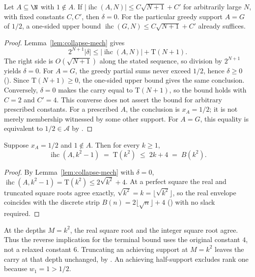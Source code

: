 \begin{prop}
\label{prop:collapse}
Let $A \subseteq \N$ with $1 \notin A$. If $|\operatorname{ihc}(A,N)|\le C\sqrt{N+1}+C'$ for arbitrarily
large $N$, with fixed constants $C,C'$, then $\delta=0$.
For the particular greedy support $A=G$ of $1/2$, a one-sided upper bound
$\operatorname{ihc}(G,N)\le C\sqrt{N+1}+C'$ already suffices.
\end{prop}

\begin{proof}
Lemma~\ref{lem:collapse-mech} gives
\[
 2^{N+1}|\delta|
 \le |\operatorname{ihc}(A,N)|+\mathrm T(N+1).
\]
The right side is $O(\sqrt{N+1})$ along the stated sequence, so division by
$2^{N+1}$ yields $\delta=0$.  For $A=G$, the greedy partial sums never
exceed $1/2$, hence $\delta\ge0$
().
Since $\mathrm T(N+1)\ge0$, the one-sided upper bound gives the same
conclusion.  Conversely, $\delta=0$ makes the carry equal to
$\mathrm T(N+1)$, so the bound holds with $C=2$ and $C'=4$.
This converse does not assert the bound for arbitrary prescribed constants.
For a prescribed $A$, the conclusion is $x_A=1/2$; it is not merely
membership witnessed by some other support.  For $A=G$, this equality is
equivalent to $1/2\in\mathcal A$
by .
\end{proof}

\begin{lem}
\label{lem:sqrt-witness}
Suppose $x_A = 1/2$ and $1 \notin A$. Then for every $k \ge 1$,
\[
  \operatorname{ihc}(A, k^2 - 1) \;=\; \mathrm{T}(k^2) \;\le\; 2k + 4 \;=\; \ensuremath{B}(k^2).
\]
\end{lem}

\begin{proof}
By Lemma~\ref{lem:collapse-mech} with $\delta = 0$, $\operatorname{ihc}(A,k^2-1) = \mathrm{T}(k^2)
\le 2\sqrt{k^2} + 4$. At a perfect square the real and truncated square roots agree exactly,
$\sqrt{k^2} = k = \lfloor \sqrt{k^2} \rfloor$, so the real envelope coincides with the discrete
strip $\ensuremath{B}(n) = 2\lfloor\sqrt n\rfloor + 4$
() with no slack required.
\end{proof}

At the depths $M=k^2$, the real square root and the integer square root
agree.  Thus the reverse implication for the terminal bound uses the
original constant $4$, not a relaxed constant $6$.  Truncating an achieving
support at $M=k^2$ leaves the carry at that depth unchanged, by
.
An achieving half-support excludes rank one because $w_1=1>1/2$.

